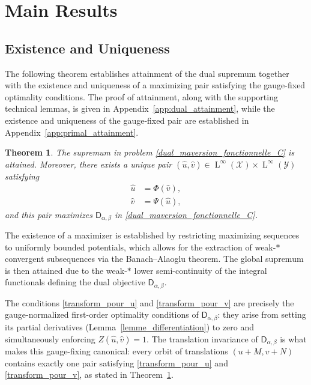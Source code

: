\documentclass{article}
\newtheorem{theorem}{Theorem}[section]
\begin{document}
\section{Main Results}
\subsection{Existence and Uniqueness}
\label{section_dual_attainment}

The following theorem establishes attainment of the dual supremum together with the existence and uniqueness of a maximizing pair satisfying the gauge-fixed optimality conditions. The proof of attainment, along with the supporting technical lemmas, is given in Appendix~\ref{app:dual_attainment}, while the existence and uniqueness of the gauge-fixed pair are established in Appendix~\ref{app:primal_attainment}.

\begin{theorem}
\label{theoreme_dual_attainment}
The supremum in problem \eqref{dual_maversion_fonctionnelle_C} is attained. Moreover, there exists a unique pair $(\hat{u}, \hat{v}) \in \operatorname{L}^\infty(\mathcal{X}) \times \operatorname{L}^\infty(\mathcal{Y})$ satisfying
\begin{align}
\label{transform_pour_u}
\hat{u} &= \Phi(\hat{v}), \\
\label{transform_pour_v}
\hat{v} &= \Psi(\hat{u}),
\end{align}
and this pair maximizes $\mathsf{D}_{\alpha,\beta}$ in
\eqref{dual_maversion_fonctionnelle_C}.
\end{theorem}

The existence of a maximizer is established by restricting maximizing sequences to uniformly bounded potentials, which allows for the extraction of weak-$*$ convergent subsequences via the Banach--Alaoglu theorem. The global supremum is then attained due to the weak-$*$ lower semi-continuity of the integral functionals defining the dual objective $\mathsf{D}_{\alpha,\beta}$.

The conditions \eqref{transform_pour_u} and \eqref{transform_pour_v} are precisely the
gauge-normalized first-order optimality conditions of $\mathsf{D}_{\alpha,\beta}$: they
arise from setting its partial derivatives (Lemma~\ref{lemme_differentiation}) to zero
and simultaneously enforcing $Z(\hat{u}, \hat{v}) = 1$. The translation invariance of
$\mathsf{D}_{\alpha,\beta}$ is what makes this gauge-fixing canonical: every orbit of
translations $(u + M, v + N)$ contains exactly one pair satisfying
\eqref{transform_pour_u} and \eqref{transform_pour_v}, as stated in
Theorem~\ref{theoreme_dual_attainment}.
\end{document}
